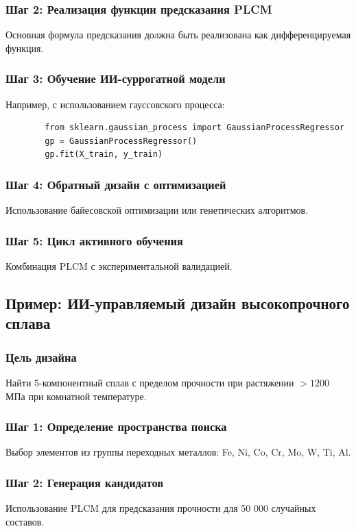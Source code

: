 \documentclass[12pt,a4paper]{article}
\begin{document}
	\subsubsection{Шаг 2: Реализация функции предсказания PLCM}
	Основная формула предсказания должна быть реализована как дифференцируемая функция.
	
	\subsubsection{Шаг 3: Обучение ИИ-суррогатной модели}
	Например, с использованием гауссовского процесса:
	\begin{verbatim}
		from sklearn.gaussian_process import GaussianProcessRegressor
		gp = GaussianProcessRegressor()
		gp.fit(X_train, y_train)
	\end{verbatim}
	
	\subsubsection{Шаг 4: Обратный дизайн с оптимизацией}
	Использование байесовской оптимизации или генетических алгоритмов.
	
	\subsubsection{Шаг 5: Цикл активного обучения}
	Комбинация PLCM с экспериментальной валидацией.
	
	\subsection{Пример: ИИ-управляемый дизайн высокопрочного сплава}
	
	\subsubsection{Цель дизайна}
	Найти 5-компонентный сплав с пределом прочности при растяжении \(> 1200\) МПа при комнатной температуре.
	
	\subsubsection{Шаг 1: Определение пространства поиска}
	Выбор элементов из группы переходных металлов: Fe, Ni, Co, Cr, Mo, W, Ti, Al.
	
	\subsubsection{Шаг 2: Генерация кандидатов}
	Использование PLCM для предсказания прочности для 50 000 случайных составов.
	
\end{document}

